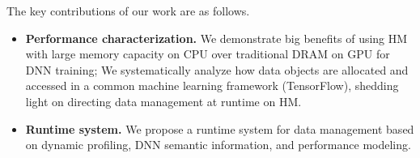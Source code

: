 The key contributions of our work are as follows.
\begin{itemize}[leftmargin=*]
    \item \textbf{Performance characterization.} \textcolor{check}{We demonstrate big benefits of using HM with large memory capacity on CPU over traditional DRAM on GPU for DNN training; We %
    systematically analyze how data objects are allocated and accessed in a common machine learning framework (TensorFlow), shedding light on directing data management at runtime on HM.}   
    
    
    


\item \textbf{Runtime system.} \textcolor{check}{We propose a runtime system for data management based on dynamic profiling, DNN semantic information, and performance modeling.}





\end{itemize}
